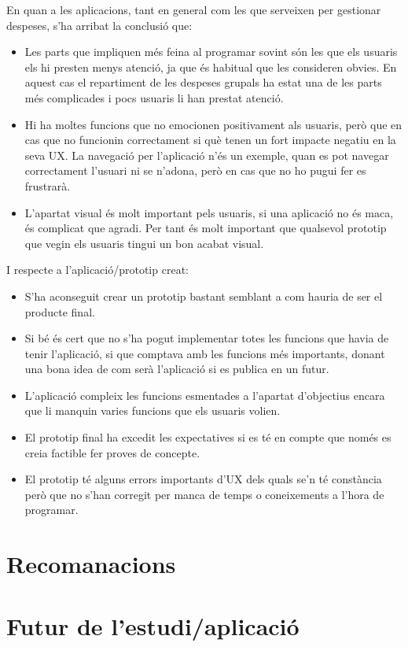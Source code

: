 En quan a les aplicacions, tant en general com les que serveixen per gestionar despeses, s'ha arribat la conclusió que:

\begin{itemize}
\item Les parts que impliquen més feina al programar sovint són les que els usuaris els hi presten menys atenció, ja que és habitual que les consideren obvies. En aquest cas el repartiment de les despeses grupals ha estat una de les parts més complicades i pocs usuaris li han prestat atenció.
\item Hi ha moltes funcions que no emocionen positivament als usuaris, però que en cas que no funcionin correctament si què tenen un fort impacte negatiu en la seva \ac{UX}. La navegació per l'aplicació n'és un exemple, quan es pot navegar correctament l'usuari ni se n'adona, però en cas que no ho pugui fer es frustrarà.
\item L'apartat visual és molt important pels usuaris, si una aplicació no és maca, és complicat que agradi. Per tant és molt important que qualsevol prototip que vegin els usuaris tingui un bon acabat visual. 
\end{itemize}

I respecte a l'aplicació/prototip creat:

\begin{itemize}
\item S'ha aconseguit crear un prototip bastant semblant a com hauria de ser el producte final.
\item Si bé és cert que no s'ha pogut implementar totes les funcions que havia de tenir l'aplicació, si que comptava amb les funcions més importants, donant una bona idea de com serà l'aplicació si es publica en un futur. %
\item L'aplicació compleix les funcions esmentades a l'apartat d'objectius encara que li manquin varies funcions que els usuaris volien.
\item El prototip final ha excedit les expectatives si es té en compte que només es creia factible fer proves de concepte.
\item El prototip té alguns errors importants d'\ac{UX} dels quals se'n té constància però que no s'han corregit per manca de temps o coneixements a l'hora de programar. %
\end{itemize}

\section{Recomanacions}

\section{Futur de l'estudi/aplicació}